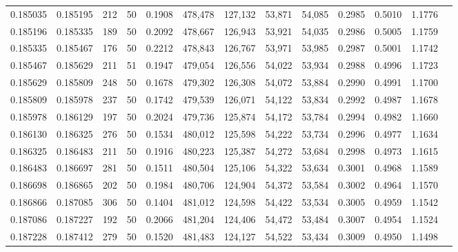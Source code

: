 \begin{tabular}{rrrrrrrrrrrrr}
0.185035 & 0.185195 &   212 &  50 &                                     0.1908 & 478,478 & 127,132 &  53,871 &  54,085 & 0.2985 & 0.5010 & 1.1776 \\
0.185196 & 0.185335 &   189 &  50 &                                     0.2092 & 478,667 & 126,943 &  53,921 &  54,035 & 0.2986 & 0.5005 & 1.1759 \\
0.185335 & 0.185467 &   176 &  50 &                                     0.2212 & 478,843 & 126,767 &  53,971 &  53,985 & 0.2987 & 0.5001 & 1.1742 \\
0.185467 & 0.185629 &   211 &  51 &                                     0.1947 & 479,054 & 126,556 &  54,022 &  53,934 & 0.2988 & 0.4996 & 1.1723 \\
0.185629 & 0.185809 &   248 &  50 &                                     0.1678 & 479,302 & 126,308 &  54,072 &  53,884 & 0.2990 & 0.4991 & 1.1700 \\
0.185809 & 0.185978 &   237 &  50 &                                     0.1742 & 479,539 & 126,071 &  54,122 &  53,834 & 0.2992 & 0.4987 & 1.1678 \\
0.185978 & 0.186129 &   197 &  50 &                                     0.2024 & 479,736 & 125,874 &  54,172 &  53,784 & 0.2994 & 0.4982 & 1.1660 \\
0.186130 & 0.186325 &   276 &  50 &                                     0.1534 & 480,012 & 125,598 &  54,222 &  53,734 & 0.2996 & 0.4977 & 1.1634 \\
0.186325 & 0.186483 &   211 &  50 &                                     0.1916 & 480,223 & 125,387 &  54,272 &  53,684 & 0.2998 & 0.4973 & 1.1615 \\
0.186483 & 0.186697 &   281 &  50 &                                     0.1511 & 480,504 & 125,106 &  54,322 &  53,634 & 0.3001 & 0.4968 & 1.1589 \\
0.186698 & 0.186865 &   202 &  50 &                                     0.1984 & 480,706 & 124,904 &  54,372 &  53,584 & 0.3002 & 0.4964 & 1.1570 \\
0.186866 & 0.187085 &   306 &  50 &                                     0.1404 & 481,012 & 124,598 &  54,422 &  53,534 & 0.3005 & 0.4959 & 1.1542 \\
0.187086 & 0.187227 &   192 &  50 &                                     0.2066 & 481,204 & 124,406 &  54,472 &  53,484 & 0.3007 & 0.4954 & 1.1524 \\
0.187228 & 0.187412 &   279 &  50 &                                     0.1520 & 481,483 & 124,127 &  54,522 &  53,434 & 0.3009 & 0.4950 & 1.1498 \\

\end{tabular}
